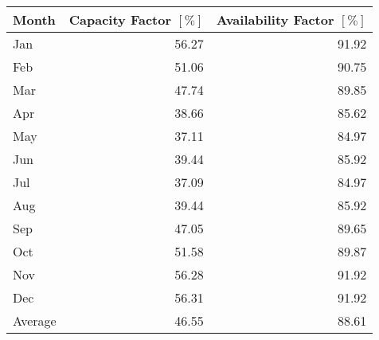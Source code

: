\begin{tabular}{lrr}
\toprule
   Month &  Capacity Factor $[\%]$ &  Availability Factor $[\%]$ \\
\midrule
     Jan &                   56.27 &                       91.92 \\
     Feb &                   51.06 &                       90.75 \\
     Mar &                   47.74 &                       89.85 \\
     Apr &                   38.66 &                       85.62 \\
     May &                   37.11 &                       84.97 \\
     Jun &                   39.44 &                       85.92 \\
     Jul &                   37.09 &                       84.97 \\
     Aug &                   39.44 &                       85.92 \\
     Sep &                   47.05 &                       89.65 \\
     Oct &                   51.58 &                       89.87 \\
     Nov &                   56.28 &                       91.92 \\
     Dec &                   56.31 &                       91.92 \\
 Average &                   46.55 &                       88.61 \\
\bottomrule
\end{tabular}
